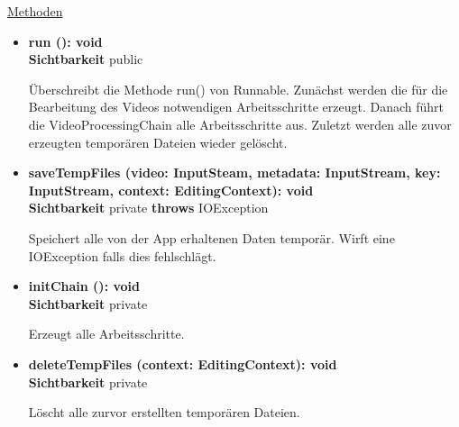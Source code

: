 \underline{Methoden}
\begin{itemize}
\itemsep0pt
\item \textbf{run (): void}\hfill\\
\textbf{Sichtbarkeit} public

Überschreibt die Methode run() von Runnable. Zunächst werden die für die Bearbeitung des Videos notwendigen Arbeitsschritte erzeugt. Danach führt die VideoProcessingChain alle Arbeitsschritte aus. Zuletzt werden alle zuvor erzeugten temporären Dateien wieder gelöscht.

\item \textbf{saveTempFiles (video: InputSteam, metadata: InputStream, 
key: InputStream, context: EditingContext): void}\hfill\\
\textbf{Sichtbarkeit} private \newline
\textbf{throws} IOException 

Speichert alle von der App erhaltenen Daten temporär. Wirft eine IOException falls dies fehlschlägt.

\item \textbf{initChain (): void}\hfill\\
\textbf{Sichtbarkeit} private

Erzeugt alle Arbeitsschritte.

\item \textbf{deleteTempFiles (context: EditingContext): void}\hfill\\
\textbf{Sichtbarkeit} private

Löscht alle zurvor erstellten temporären Dateien.

\end{itemize}